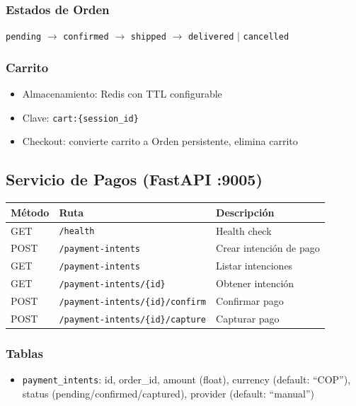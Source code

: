 \documentclass[11pt,a4paper]{article}
\begin{document}
\subsubsection{Estados de Orden}
\texttt{pending} $\rightarrow$ \texttt{confirmed} $\rightarrow$ \texttt{shipped} $\rightarrow$ \texttt{delivered} $\mid$ \texttt{cancelled}

\subsubsection{Carrito}
\begin{itemize}
    \item Almacenamiento: Redis con TTL configurable
    \item Clave: \texttt{cart:\{session\_id\}}
    \item Checkout: convierte carrito a Orden persistente, elimina carrito
\end{itemize}

\subsection{Servicio de Pagos (FastAPI :9005)}

\begin{tabularx}{\textwidth}{|l|X|l|}
\hline
\textbf{Método} & \textbf{Ruta} & \textbf{Descripción} \\
\hline
GET & \texttt{/health} & Health check \\
POST & \texttt{/payment-intents} & Crear intención de pago \\
GET & \texttt{/payment-intents} & Listar intenciones \\
GET & \texttt{/payment-intents/\{id\}} & Obtener intención \\
POST & \texttt{/payment-intents/\{id\}/confirm} & Confirmar pago \\
POST & \texttt{/payment-intents/\{id\}/capture} & Capturar pago \\
\hline
\end{tabularx}

\subsubsection{Tablas}
\begin{itemize}
    \item \texttt{payment\_intents}: id, order\_id, amount (float), currency (default: ``COP''), status (pending/confirmed/captured), provider (default: ``manual'')
\end{itemize}
\end{document}
